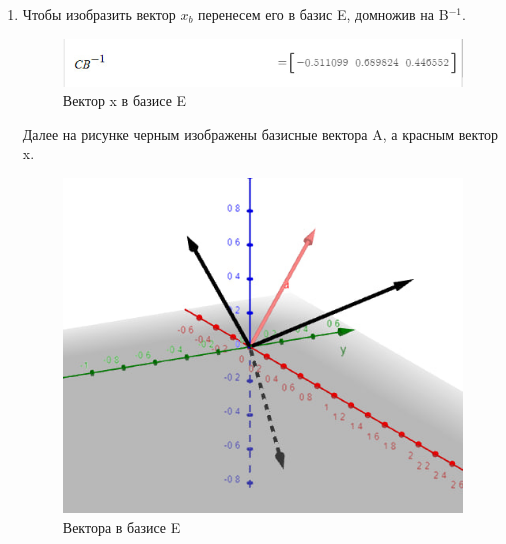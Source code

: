 \begin{enumerate}
    \item
        Чтобы изобразить вектор $x_b$ перенесем его в базис E, домножив на B$^{-1}$.\\
        \begin{figure}[H]
            \centering
            \includegraphics[width=0.6\linewidth]{2_x.png}
            \caption{Вектор x в базисе E}
        \end{figure}
        Далее на рисунке черным изображены базисные вектора A, а красным вектор x.\\
        \begin{figure}[H]
            \centering
            \includegraphics[width=0.6\linewidth]{2_E_graph.png}
            \caption{Вектора в базисе E}
        \end{figure}
\end{enumerate}


\clearpage
